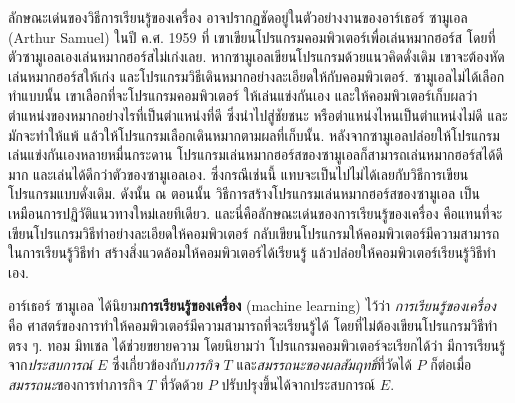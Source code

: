 ลักษณะเด่นของวิธีการเรียนรู้ของเครื่อง
อาจปรากฏชัดอยู่ในตัวอย่างงานของอาร์เธอร์ ซามูเอล (Arthur Samuel) 
ในปี ค.ศ. 1959 
ที่
เขาเขียนโปรแกรมคอมพิวเตอร์เพื่อเล่นหมากฮอร์ส\cite{SamuelML} 
โดยที่ ตัวซามูเอลเองเล่นหมากฮอร์สไม่เก่งเลย.
หากซามูเอลเขียนโปรแกรมด้วยแนวคิดดั่งเดิม
เขาจะต้องหัดเล่นหมากฮอร์สให้เก่ง
และโปรแกรมวิธีเดินหมากอย่างละเอียดให้กับคอมพิวเตอร์.
ซามูเอลไม่ได้เลือกทำแบบนั้น
เขาเลือกที่จะโปรแกรมคอมพิวเตอร์
ให้เล่นแข่งกันเอง และให้คอมพิวเตอร์เก็บผลว่า
ตำแหน่งของหมากอย่างไรที่เป็นตำแหน่งที่ดี ซึ่งนำไปสู่ชัยชนะ 
หรือตำแหน่งไหนเป็นตำแหน่งไม่ดี และมักจะทำให้แพ้ 
แล้วให้โปรแกรมเลือกเดินหมากตามผลที่เก็บนั้น.
หลังจากซามูเอลปล่อยให้โปรแกรมเล่นแข่งกันเองหลายหมื่นกระดาน โปรแกรมเล่นหมากฮอร์สของซามูเอลก็สามารถเล่นหมากฮอร์สได้ดีมาก 
และเล่นได้ดีกว่าตัวของซามูเอลเอง.
ซึ่งกรณีเช่นนี้ แทบจะเป็นไปไม่ได้เลยกับวิธีการเขียนโปรแกรมแบบดั่งเดิม.
ดังนั้น ณ ตอนนั้น วิธีการสร้างโปรแกรมเล่นหมากฮอร์สของซามูเอล
เป็นเหมือนการปฏิวัติแนวทางใหม่เลยทีเดียว. 
และนี่คือลักษณะเด่นของการเรียนรู้ของเครื่อง 
คือแทนที่จะเขียนโปรแกรมวิธีทำอย่างละเอียดให้คอมพิวเตอร์ 
กลับเขียนโปรแกรมให้คอมพิวเตอร์มีความสามารถในการเรียนรู้วิธีทำ สร้างสิ่งแวดล้อมให้คอมพิวเตอร์ได้เรียนรู้
แล้วปล่อยให้คอมพิวเตอร์เรียนรู้วิธีทำเอง.

อาร์เธอร์ ซามูเอล\cite{SamuelML} ได้นิยาม\textbf{การเรียนรู้ของเครื่อง} (machine learning) ไว้ว่า 
%
\textit{การเรียนรู้ของเครื่อง} คือ ศาสตร์ของการทำให้คอมพิวเตอร์มีความสามารถที่จะเรียนรู้ได้ โดยที่ไม่ต้องเขียนโปรแกรมวิธีทำตรง ๆ.
%
%
ทอม มิทเชล\cite{Mitchell1997a} %
ได้ช่วยขยายความ
โดยนิยามว่า
โปรแกรมคอมพิวเตอร์จะเรียกได้ว่า มีการเรียนรู้จาก\textit{ประสบการณ์} $E$ ซึ่งเกี่ยวข้องกับ\textit{ภารกิจ} $T$ 
และ\textit{สมรรถนะของผลสัมฤทธิ์}ที่วัดได้ $P$
ก็ต่อเมื่อ\textit{สมรรถนะ}ของการทำภารกิจ $T$ ที่วัดด้วย $P$ ปรับปรุงขึ้นได้จากประสบการณ์ $E$.
%
%

